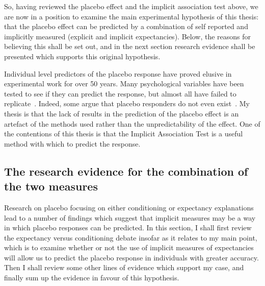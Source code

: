 
So, having reviewed the placebo effect and the implicit association test above, we are now in a position to examine the main experimental hypothesis of this thesis: that the placebo effect can be predicted by a combination of self reported and implicitly measured (explicit and implicit expectancies). Below, the reasons for believing this shall be set out, and in the next section  research evidence shall be presented which supports this original hypothesis. 

Individual level predictors of the placebo response have proved elusive in experimental work for over 50 years. Many psychological variables have been tested to see if they can predict the response, but almost all have failed to replicate~\cite{Shapiro1997}. Indeed, some argue that placebo responders do not even exist~\cite{Kaptchuk2008a}. My thesis is that the lack of results in the prediction of the placebo effect is an artefact of the methods used rather than the unpredictability of the effect. One of the contentions of this thesis is that the Implicit Association Test is a useful method with which to predict the response. 


\subsection{The research evidence for the combination of the two measures}
\label{sec:rese-base-comb}

Research on placebo focusing on either conditioning or expectancy explanations lead to a number of findings which suggest that implicit measures may be a way in which placebo responses can be predicted. In this section, I shall first review the expectancy versus conditioning debate insofar as it relates to my main point, which is to examine whether or not the use of implicit measures of expectancies will allow us to predict the placebo response in individuals with greater accuracy. Then I shall review some other lines of evidence which support my case, and finally sum up the evidence in favour of this hypothesis.

